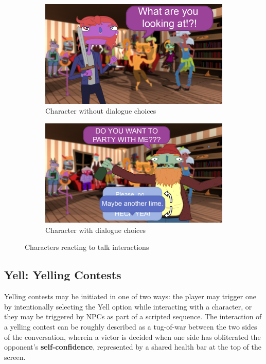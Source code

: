 \begin{figure}[H]
  \centering\begin{subfigure}{.45\textwidth}
    \centering
    \includegraphics[width=.9\linewidth]{images/UI_npc_nodialogue}
    \caption{Character without dialogue choices}
	\label{fig:speech_bubble}
  \end{subfigure}%
  \begin{subfigure}{.45\textwidth}
    \centering
    \includegraphics[width=.9\linewidth]{images/UI_npc_conversation}
    \caption{Character with dialogue choices}
	\label{fig:dialogue}
  \end{subfigure}%
  \caption{Characters reacting to talk interactions}
\end{figure}

\subsection{Yell: Yelling Contests}
\label{sec:yelling_contest}

Yelling contests may be initiated in one of two ways: the player may trigger one by intentionally selecting the Yell option while interacting with a character, or they may be triggered by NPCs as part of a scripted sequence. The interaction of a yelling contest can be roughly described as a tug-of-war between the two sides of the conversation, wherein a victor is decided when one side has obliterated the opponent's \textbf{self-confidence}, represented by a shared health bar at the top of the screen.

